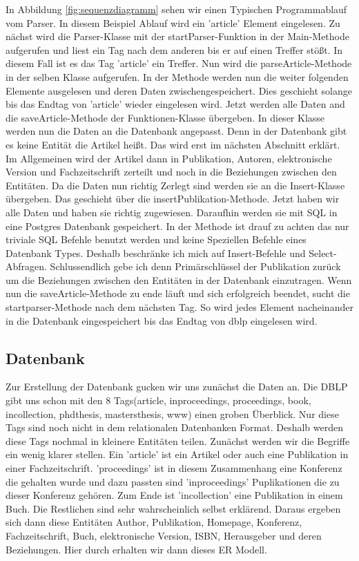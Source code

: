 \documentclass[a4paper,12pt]{article}
\begin{document}
	In Abbildung \ref{fig:sequenzdiagramm} sehen wir einen Typischen Programmablauf vom Parser. In diesem Beispiel Ablauf wird ein 'article' Element eingelesen. Zu nächst wird die Parser-Klasse mit der startParser-Funktion in der Main-Methode aufgerufen und liest ein Tag nach dem anderen bis er auf einen Treffer stößt. In diesem Fall ist es das Tag 'article' ein Treffer. Nun wird die parseArticle-Methode in der selben Klasse aufgerufen. In der Methode werden nun die weiter folgenden Elemente ausgelesen und deren Daten zwischengespeichert. Dies geschieht solange bis das Endtag von 'article' wieder eingelesen wird. Jetzt werden alle Daten and die saveArticle-Methode der Funktionen-Klasse übergeben. In dieser Klasse werden nun die Daten an die Datenbank angepasst. Denn in der Datenbank gibt es keine Entität die Artikel heißt. Das wird erst im nächsten Abschnitt erklärt. Im Allgemeinen wird der Artikel dann in Publikation, Autoren, elektronische Version und Fachzeitschrift zerteilt und noch in die Beziehungen zwischen den Entitäten. Da die Daten nun richtig Zerlegt sind werden sie an die Insert-Klasse übergeben. Das geschieht über die insertPublikation-Methode. Jetzt haben wir alle Daten und haben sie richtig zugewiesen. Daraufhin werden sie mit SQL in eine Postgres Datenbank gespeichert. In der Methode ist drauf zu achten das nur triviale SQL Befehle benutzt werden und keine Speziellen Befehle eines Datenbank Types. Deshalb beschränke ich mich auf Insert-Befehle und Select-Abfragen. Schlussendlich gebe ich denn Primärschlüssel der Publikation zurück um die Beziehungen zwischen den Entitäten in der Datenbank einzutragen. Wenn nun die saveArticle-Methode zu ende läuft und sich erfolgreich beendet, sucht die startparser-Methode nach dem nächsten Tag. So wird jedes Element nacheinander in die Datenbank eingespeichert bis das Endtag von dblp eingelesen wird.

	\subsection{Datenbank}
	Zur Erstellung der Datenbank gucken wir uns zunächst die Daten an. Die DBLP gibt uns schon mit den 8 Tags(article, inproceedings, proceedings, book, incollection, phdthesis, mastersthesis, www) einen groben Überblick. Nur diese Tags sind noch nicht in dem relationalen Datenbanken Format. Deshalb werden diese Tags nochmal in kleinere Entitäten teilen. Zunächst werden wir die Begriffe ein wenig klarer stellen. Ein 'article' ist ein Artikel oder auch eine Publikation in einer Fachzeitschrift. 'proceedings' ist in diesem Zusammenhang eine Konferenz die gehalten wurde und dazu passten sind 'inproceedings' Puplikationen die zu dieser Konferenz gehören. Zum Ende ist 'incollection' eine Publikation in einem Buch. Die Restlichen sind sehr wahrscheinlich selbst erklärend. Daraus ergeben sich dann diese Entitäten Author, Publikation, Homepage, Konferenz, Fachzeitschrift, Buch, elektronische Version, ISBN, Herausgeber und deren Beziehungen. Hier durch erhalten wir dann dieses ER Modell.
	
\end{document}
